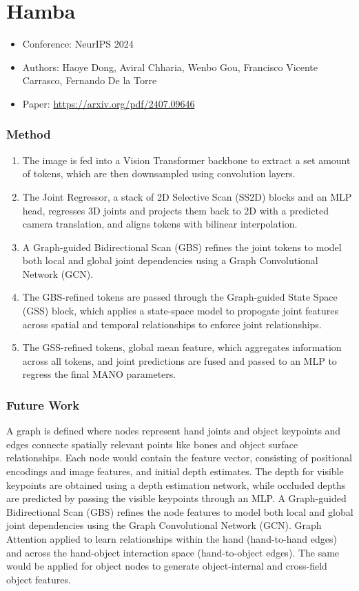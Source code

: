 \documentclass{article}
\begin{document}
\pagebreak

\section*{Hamba}

\begin{itemize}
    \item Conference: NeurIPS 2024
    \item Authors: Haoye Dong, Aviral Chharia, Wenbo Gou, Francisco Vicente Carrasco, Fernando De la Torre
    \item Paper: \url{https://arxiv.org/pdf/2407.09646}
\end{itemize}

\subsubsection*{Method}
\begin{enumerate}
    \item The image is fed into a Vision Transformer backbone to extract a set amount of tokens, which are then downsampled using convolution layers.
    \item The Joint Regressor, a stack of 2D Selective Scan (SS2D) blocks and an MLP head, regresses 3D joints and projects them back to 2D with a predicted camera translation, and aligns tokens with bilinear interpolation.
    \item A Graph-guided Bidirectional Scan (GBS) refines the joint tokens to model both local and global joint dependencies using a Graph Convolutional Network (GCN).
    \item The GBS-refined tokens are passed through the Graph-guided State Space (GSS) block, which applies a state-space model to propogate joint features across spatial and temporal relationships to enforce joint relationships.
    \item The GSS-refined tokens, global mean feature, which aggregates information across all tokens, and joint predictions are fused and passed to an MLP to regress the final MANO parameters.
\end{enumerate}

\subsubsection*{Future Work}

A graph is defined where nodes represent hand joints and object keypoints and edges connecte spatially relevant points like bones and object surface relationships. Each node would contain the feature vector, consisting of positional encodings and image features, and initial depth estimates. The depth for visible keypoints are obtained using a depth estimation network, while occluded depths are predicted by passing the visible keypoints through an MLP. A Graph-guided Bidirectional Scan (GBS) refines the node features to model both local and global joint dependencies using the Graph Convolutional Network (GCN). Graph Attention applied to learn relationships within the hand (hand-to-hand edges) and across the hand-object interaction space (hand-to-object edges). The same would be applied for object nodes to generate object-internal and cross-field object features.
\end{document}
